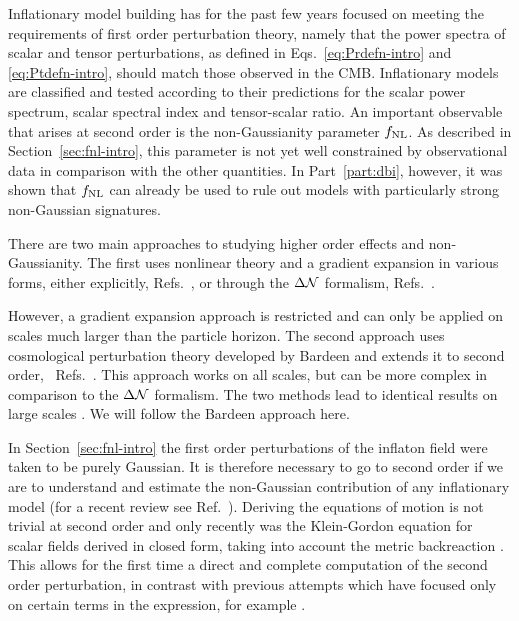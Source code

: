 Inflationary model building has for the past few years focused on
meeting the requirements of first order perturbation theory, namely
that the power spectra of scalar and tensor perturbations, as defined in
Eqs.~\eqref{eq:Prdefn-intro} and \eqref{eq:Ptdefn-intro}, should match
those observed in the CMB.  Inflationary
models are classified and tested according to their predictions for the scalar power
spectrum, scalar spectral index and tensor-scalar ratio. 
An important observable that arises at second order is the non-Gaussianity
parameter $f_{\mathrm{NL}}$. As described in Section~\ref{sec:fnl-intro}, this parameter is
not yet well constrained by observational data in comparison with the
other quantities. In Part~\ref{part:dbi}, however, it was shown that $f_{\mathrm{NL}}$ can
already be used to rule out models with particularly strong non-Gaussian signatures.


There are two main approaches to studying higher order effects and
non-Gaussianity.  
The first uses nonlinear theory and a gradient expansion in various
forms, either explicitly, \eg
Refs.~\cite{Salopek:1990jq,Rigopoulos:2005xx}, or through the
$\Delta \mathcal{N}$ formalism, \eg
Refs.~\cite{Starobinsky:1982ee,
Starobinsky:1986fxa, Sasaki:1995aw, Sasaki:1998ug,
Lyth:2004gb,Lyth:2005fi,Langlois:2006vv}.

However, a gradient expansion approach is restricted and can only be applied on
scales much larger than the particle horizon.  
The
second approach uses cosmological perturbation theory developed by Bardeen
\cite{Bardeen:1980kt} and extends it to second order,
\eg~Refs.~\cite{Tomita:1967,Mukhanov:1996ak,Bruni:1996im,
  Acquaviva:2002ud,Nakamura:2003wk,Noh:2004bc,
  Bernardeau:2002jy,Maldacena:2002vr,
  Finelli:2003bp,Bartolo:2004if,Enqvist:2004bk,Lyth:2005du,Seery:2005gb,
  Malik:2003mv, Barnaby:2006cq}\footnotemark.
%
This approach works on all scales, but can be more complex in comparison to the
$\Delta \mathcal{N}$ formalism. The two methods lead to identical results on large scales
\cite{Malik:2005cy}. We
will follow the Bardeen approach here.


In Section~\ref{sec:fnl-intro} the first order perturbations of the inflaton field
were taken to be purely Gaussian. It is therefore 
necessary to go to second order if we are to understand and estimate
the non-Gaussian contribution of any inflationary model (for a recent
review see Ref.~\cite{Malik:2008im}). Deriving the equations of motion is
not trivial at second order and only recently was the Klein-Gordon
equation for scalar fields derived in closed form, taking into account the
metric backreaction \cite{Malik:2006ir}. This allows for the first time
a direct and complete computation of the second order perturbation, in
contrast with previous attempts which have focused only on certain
terms in the expression, for example .


